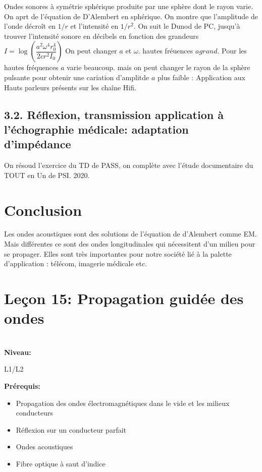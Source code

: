 \documentclass[french, a4paper, 10pt, twocolumn, landscape]{article}
\begin{document}
Ondes sonores à symétrie sphérique produite par une sphère dont le rayon varie. On aprt de l'équation de D'Alembert en sphérique. On montre que l'amplitude de l'onde décroît en $1/r$ et l'intensité en $1/r^2$. On suit le Dunod de PC, jusqu'à trouver l'intensité sonore en décibels en fonction des grandeurs $I=\log\left(\dfrac{a^2\omega^4r_0^4}{2cr^2I_0}\right)$ On peut changer $a$ et $\omega$. hautes fréuences $a grand$. Pour les hautes fréquences $a$ varie beaucoup. mais on peut changer le rayon de la sphère pulsante pour obtenir une cariation d'amplitde $a$ plus faible : Application aux Hauts parleurs présents sur les chaîne Hifi. 

\subsection*{3.2. Réflexion, transmission application à l'échographie médicale: adaptation d'impédance} 

On résoud l'exercice du TD de PASS, on complète avec l'étude documentaire du TOUT en Un de PSI. 2020. 

\section*{Conclusion}

Les ondes acoustiques sont des solutions de l'équation de d'Alembert comme EM. Mais différentes ce sont des ondes longitudinales qui nécessitent d'un milieu pour se propager. Elles sont très importantes pour notre société lié à la palette d'application : télécom, imagerie médicale etc.

\clearpage

\section*{Leçon 15: Propagation guidée des ondes}

\hrulefill\\
\noindent\textbf{\large Niveau:}\medskip

L1/L2\medskip

\noindent\textbf{\large Prérequis:} \medskip 

\begin{itemize}
	\item Propagation des ondes électromagnétiques dans le vide et les milieux conducteurs
	\item Réflexion sur un conducteur parfait
	\item Ondes acoustiques
	\item Fibre optique à saut d’indice
\end{itemize}
\end{document}
